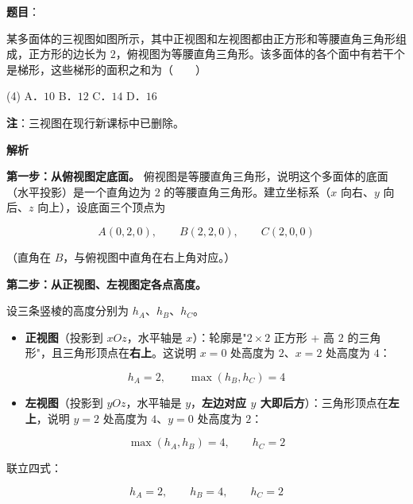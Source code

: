 \begin{answer}

\textbf{题目}：

某多面体的三视图如图所示，其中正视图和左视图都由正方形和等腰直角三角形组成，正方形的边长为 $2$，俯视图为等腰直角三角形。该多面体的各个面中有若干个是梯形，这些梯形的面积之和为\mbox{（　　）}
\nopagebreak[4]
\begin{center}\end{center}
\nopagebreak[4]
\begin{gkopts}(4)
\task A．$10$
\task B．$12$
\task C．$14$
\task D．$16$
\end{gkopts}

\begin{gktip}
\textbf{注}：三视图在现行新课标中已删除。
\end{gktip}

\textbf{解析}

\textbf{第一步：从俯视图定底面。} 俯视图是等腰直角三角形，说明这个多面体的底面（水平投影）是一个直角边为 $2$ 的等腰直角三角形。建立坐标系（$x$ 向右、$y$ 向后、$z$ 向上），设底面三个顶点为

\nopagebreak[4]
\[A(0,2,0),\qquad B(2,2,0),\qquad C(2,0,0)\]

（直角在 $B$，与俯视图中直角在右上角对应。）

\textbf{第二步：从正视图、左视图定各点高度。}

设三条竖棱的高度分别为 $h_A$、$h_B$、$h_C$。

\begin{itemize}
\item \textbf{正视图}（投影到 $xOz$，水平轴是 $x$）：轮廓是"$2\times2$ 正方形 + 高 $2$ 的三角形"，且三角形顶点在\textbf{右上}。这说明 $x=0$ 处高度为 $2$、$x=2$ 处高度为 $4$：
\end{itemize}
\nopagebreak[4]
\[h_A=2,\qquad \max\left(h_B,h_C\right)=4\]
\begin{itemize}
\item \textbf{左视图}（投影到 $yOz$，水平轴是 $y$，\textbf{左边对应 $y$ 大即后方}）：三角形顶点在\textbf{左上}，说明 $y=2$ 处高度为 $4$、$y=0$ 处高度为 $2$：
\end{itemize}
\nopagebreak[4]
\[\max\left(h_A,h_B\right)=4,\qquad h_C=2\]

联立四式：

\nopagebreak[4]
\[h_A=2,\qquad h_B=4,\qquad h_C=2\]


\end{answer}
